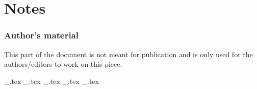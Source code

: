 \part{Notes}
\section{Author's material}
This part of the document is not meant for publication and is only used for the authors/editors to work on this piece.

{_.tex}
{_.tex}
{_.tex}
{_.tex}
{_.tex}
